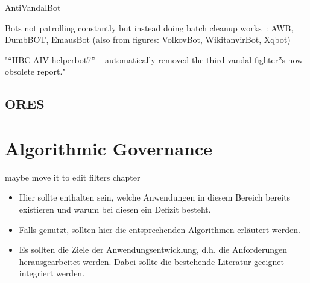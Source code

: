 AntiVandalBot~\cite{HalRied2012}

Bots not patrolling constantly but instead doing batch cleanup works~\cite{GeiHal2013}:
AWB, DumbBOT, EmausBot
(also from figures: VolkovBot, WikitanvirBot, Xqbot)

\cite{GeiRib2010}
"“HBC AIV helperbot7” – automatically
removed the third vandal fighter‟s now-obsolete report."

\subsection{ORES}


\section{Algorithmic Governance}

maybe move it to edit filters chapter

\begin{itemize}
    \item Hier sollte enthalten sein, welche Anwendungen in diesem Bereich bereits existieren und warum bei diesen ein Defizit besteht.
    \item Falls genutzt, sollten hier die entsprechenden Algorithmen erläutert werden.
    \item Es sollten die Ziele der Anwendungsentwicklung, d.h. die Anforderungen herausgearbeitet werden. Dabei sollte die bestehende Literatur geeignet integriert werden.
\end{itemize}
